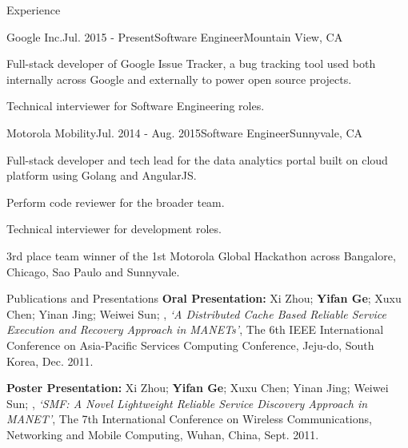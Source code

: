 \documentclass{resume} %
\begin{document}
\begin{rSection}{Experience}

\begin{rSubsection}{Google Inc.}{Jul. 2015 - Present}{Software Engineer}{Mountain View, CA}
\item Full-stack developer of Google Issue Tracker, a bug tracking tool used both internally across Google and externally to power open source projects.
\item Technical interviewer for Software Engineering roles.

\end{rSubsection}

\begin{rSubsection}{Motorola Mobility}{Jul. 2014 - Aug. 2015}{Software Engineer}{Sunnyvale, CA}
\item Full-stack developer and tech lead for the data analytics portal built on cloud platform using Golang and AngularJS.
\item Perform code reviewer for the broader team.
\item Technical interviewer for development roles.
\item 3rd place team winner of the 1st Motorola Global Hackathon across Bangalore, Chicago, Sao Paulo and Sunnyvale.
\end{rSubsection}



\end{rSection}


\begin{rSection}{Publications and Presentations}
{\bf Oral Presentation:} Xi Zhou; {\bf Yifan Ge}; Xuxu Chen; Yinan Jing; Weiwei Sun; , {\em `A Distributed Cache Based Reliable Service Execution and Recovery Approach in MANETs'}, The 6th IEEE International Conference on Asia-Pacific Services Computing Conference, Jeju-do, South Korea, Dec. 2011.

{\bf Poster Presentation:} Xi Zhou; {\bf Yifan Ge}; Xuxu Chen; Yinan Jing; Weiwei Sun; , {\em `SMF: A Novel Lightweight Reliable Service Discovery Approach in MANET'}, The 7th International Conference on Wireless Communications, Networking and Mobile Computing, Wuhan, China, Sept. 2011.
\end{rSection}
\end{document}
